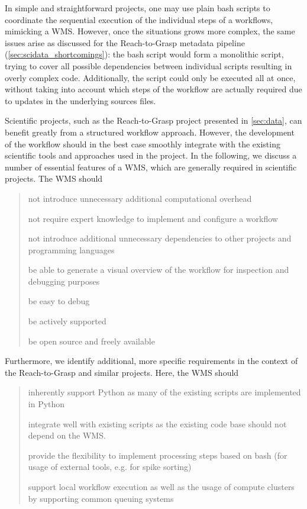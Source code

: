 In simple and straightforward projects, one may use plain bash scripts to coordinate the sequential execution of the individual steps of a workflows, mimicking a WMS. However, once the situations grows more complex, the same issues arise as discussed for the Reach-to-Grasp metadata pipeline (\cref{sec:scidata_shortcomings}): the bash script would form a monolithic script, trying to cover all possible dependencies between individual scripts resulting in overly complex code. Additionally, the script could only be executed all at once, without taking into account which steps of the workflow are actually required due to updates in the underlying sources files.

Scientific projects, such as the Reach-to-Grasp project presented in \cref{sec:data}, can benefit greatly from a structured workflow approach. However, the development of the workflow should in the best case smoothly integrate with the existing scientific tools and approaches used in the project. In the following, we discuss a number of essential features of a WMS, which are generally required in scientific projects. The WMS should 
\begin{quote}
\begin{description}
 \setlength{\itemsep}{5pt}
 \setlength{\parskip}{0pt}
 \setlength{\parsep}{0pt}
 \item[slim] not introduce unnecessary additional computational overhead
 \item[easy]  not require expert knowledge to implement and configure a workflow
 \item[standalone] not introduce additional unnecessary dependencies to other projects and programming languages
  \item[visual] be able to generate a visual overview of the workflow for inspection and debugging purposes
  \item[debuggable] be easy to debug
  \item[active] be actively supported
  \item[open] be open source and freely available\\
\end{description}
\end{quote}
Furthermore, we identify additional, more specific requirements in the context of the Reach-to-Grasp and similar projects. Here, the WMS should
\begin{quote}
\begin{description}
 \setlength{\itemsep}{5pt}
 \setlength{\parskip}{0pt}
 \setlength{\parsep}{0pt}
 \item[Python] inherently support Python as many of the existing scripts are implemented in Python
 \item[integration] integrate well with existing scripts as the existing code base should not depend on the WMS.
 \item[flexiblility] provide the flexibility to implement processing steps based on bash (for usage of external tools, e.g. for spike sorting)
 \item[HPC] support local workflow execution as well as the usage of compute clusters by supporting common queuing systems
\end{description}
\end{quote}

